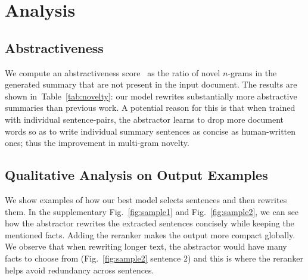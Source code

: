 \documentclass[11pt,a4paper]{article}
\def\figref#1{Fig.~\ref{#1}}
\def\tabref#1{Table~\ref{#1}}
\begin{document}
\begin{table}[t]
\centering
{}
\vspace{-10pt}
\caption{
Abstractiveness: novel $n$-gram counts.
}
\label{tab:novelty}
\vspace{-10pt}
\end{table}

\section{Analysis}

\subsection{Abstractiveness}
We compute an abstractiveness score~\cite{get_to_the_point}
as the ratio of novel $n$-grams in the generated summary that are not present
in the input document. The results are shown in~\tabref{tab:novelty}: our model rewrites substantially more abstractive summaries than previous work.
A potential reason for this is that when trained with individual sentence-pairs, the abstractor learns to drop more document words so as to write individual summary sentences as concise as human-written ones; thus the improvement in multi-gram novelty.




\subsection{Qualitative Analysis on Output Examples}
\label{sec:qualitative}

We show examples of how our best model selects sentences and then rewrites them.
In the supplementary \figref{fig:sample1} and \figref{fig:sample2}, we can see how the abstractor rewrites the extracted sentences concisely while keeping the mentioned facts.
Adding the reranker makes the output more compact globally.
We observe that when rewriting longer text, the abstractor would have many facts to choose from (\figref{fig:sample2} sentence 2) and
this is where the reranker helps avoid redundancy across sentences.
\end{document}
